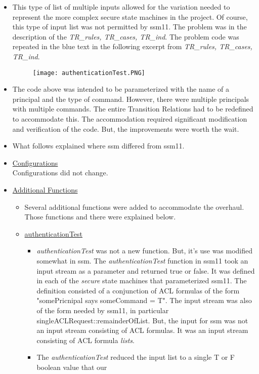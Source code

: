 \begin{itemize}
   \item This type of list of multiple inputs allowed for the variation needed to represent the
     more complex secure state machines in the project.  Of course, this type of input list was not
     permitted by ssm11.  The problem was in the description of the \textit{TR_rules, TR_cases, TR_ind}.
     The problem code was repeated in the blue text in the following excerpt from \textit{TR_rules, TR_cases, TR_ind}.
\begin{figure}[h]
  \centering
  \texttt{[image: authenticationTest.PNG]}
\end{figure}
\item The code above was intended to be parameterized with the name of a principal and the type of
  command.  However, there were multiple principals with multiple commands.  The entire Transition
  Relations had to be redefined to accommodate this.  The accommodation required significant modification
  and verification of the code.  But, the improvements were worth the wait.  
\item What follows explained where ssm differed from ssm11.
\item \underline{Configurations}\\
  Configurations did not change.
\item \underline{Additional Functions}
  \begin{itemize}
  \item Several additional functions were added to accommodate the overhaul. Those functions and
    there were explained below.
  \item \underline{authenticationTest}
    \begin{itemize}
    \item \textit{authenticationTest} was not a new function.  But, it's use was modified somewhat in ssm.
      The \textit{authenticationTest} function in ssm11 took an input stream as a parameter and returned
      true or false.  It was defined in each of the \textit{secure} state machines that parameterized ssm11.
      The definition consisted of a conjunction of ACL formulas of the form "somePricnipal says someCommand = T".
      The input stream was also of the form needed by ssm11, in particular singleACLRequest::remainderOfList.
      But, the input for ssm was not an input stream consisting of ACL formulas.  It was an input stream
      consisting of ACL formula \textit{lists}.
    \item The \textit{authenticationTest} reduced the input list to a single T or F boolean value that our

\end{itemize}
\end{itemize}
\end{itemize}
